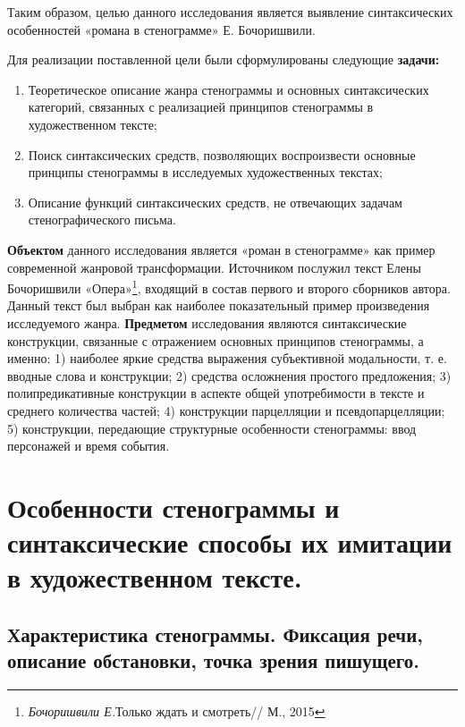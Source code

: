 \documentclass{kursa4}
\begin{document}
    {Таким образом, целью данного исследования является
    выявление синтаксических особенностей «романа в стенограмме» Е.
    Бочоришвили.}

    {Для реализации поставленной цели были сформулированы следующие \textbf{задачи:}
    
    \begin{enumerate}
      \item Теоретическое описание жанра стенограммы и
      основных синтаксических категорий, связанных с реализацией принципов
      стенограммы в художественном тексте;
      \item Поиск синтаксических средств, позволяющих
      воспроизвести основные принципы стенограммы в исследуемых
      художественных текстах;
      \item Описание функций синтаксических средств, не
      отвечающих задачам стенографического письма.
    \end{enumerate}

    \textbf{Объектом} данного исследования является «роман в
    стенограмме» как пример современной жанровой трансформации. Источником
    послужил текст Елены Бочоришвили «Опера»\footnote{\textit{Бочоришвили Е.}{Только
    ждать и смотреть// М., 2015}}, входящий в состав первого и второго сборников автора. Данный текст был выбран как наиболее показательный пример произведения исследуемого жанра. 
    \textbf{Предметом} исследования являются синтаксические конструкции, связанные с отражением основных принципов стенограммы, а именно: 1) наиболее яркие средства выражения субъективной модальности, т. е. вводные слова и конструкции; 2) средства осложнения простого предложения; 3)  полипредикативные конструкции в аспекте общей употребимости в тексте и среднего количества частей; 4) конструкции парцелляции и псевдопарцелляции; 5) конструкции, передающие структурные особенности стенограммы: ввод персонажей и время события. 

  \setcounter{chapter}{0}
  \chapter {Особенности стенограммы и
  синтаксические способы их имитации в художественном тексте.}

    \section {Характеристика стенограммы. Фиксация
    речи, описание обстановки, точка зрения пишущего.}

}
\end{document}
